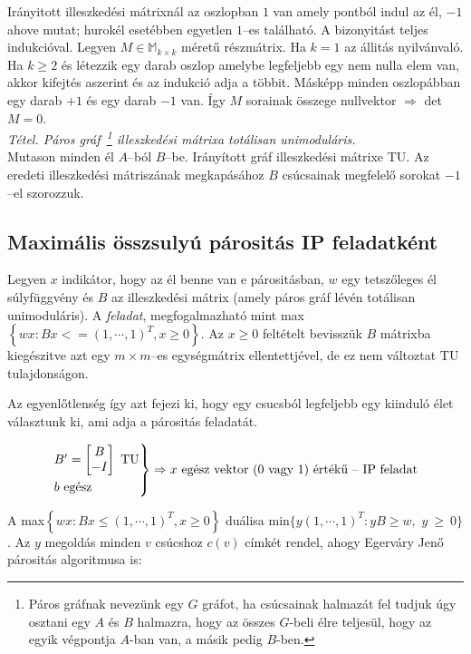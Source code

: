 Irányitott illeszkedési mátrixnál az oszlopban $1$ van amely pontból indul az
él, $-1$ ahove mutat; hurokél esetébben egyetlen $1$--es található. A
bizonyitást teljes indukcióval. Legyen $M \in \mathbb{M}_{k\times k}$ méretű
részmátrix. Ha $k=1$ az állitás nyilvánvaló. Ha $k \geq 2$ és létezzik egy darab
oszlop amelybe legfeljebb egy nem nulla elem van, akkor kifejtés aszerint és az
indukció adja a többit. Másképp minden oszlopábban egy darab $+1$ és egy darab
$-1$ van. Így $M$ sorainak összege nullvektor $\Rightarrow$ det$M=0$.\\

\emph{Tétel. Páros gráf~\footnote{Páros gráfnak nevezünk egy $G$ gráfot, ha
csúcsainak halmazát fel tudjuk úgy osztani egy $A$ és $B$ halmazra, hogy az
összes $G$-beli élre teljesül, hogy az egyik végpontja $A$-ban van, a másik
pedig $B$-ben.} illeszkedési mátrixa totálisan unimoduláris.}\\ 

Mutason minden él $A$--ból $B$--be. Irányított gráf illeszkedési mátrixe TU. Az
eredeti illeszkedési mátriszának megkapásához $B$ csúcsainak megfelelő sorokat
$-1$--el szorozzuk.

\subsection{Maximális összsulyú párositás IP feladatként}

Legyen $x$ indikátor, hogy az él benne van e párositásban, $w$ egy tetszőleges
él súlyfüggvény és $B$ az illeszkedési mátrix (amely páros gráf lévén totálisan
unimoduláris). A \emph{feladat}, megfogalmazható mint max$\left\{ wx:Bx <= (1,
\cdots, 1)^T, x \geq 0 \right\}$. Az $x \geq 0 $ feltételt bevisszük $B$
mátrixba kiegészitve azt egy $m \times m$--es egységmátrix ellentettjével, de ez
nem változtat TU tulajdonságon. 

Az egyenlőtlenség így azt fejezi ki, hogy egy csucsból legfeljebb egy kiinduló
élet választunk ki, ami adja a párositás feladatát. 

\[
\begin{rcases}
B'=\begin{bmatrix} B \\ -I \end{bmatrix} \text{ TU} \\
b \text{ egész}
\end{rcases} \Rightarrow x \text{ egész vektor ($0$ vagy $1$) értékű -- IP feladat}
\]

A max$\left\{ wx : Bx \leq (1,\cdots,1)^T, x \geq 0 \right\}$ duálisa
min$\{ y(1,\cdots,1)^T : yB \geq w,$ $y~\geq~0\}$. Az $y$ megoldás
minden $v$ csúcshoz $c(v)$ címkét rendel, ahogy Egerváry Jenő párositás
algoritmusa is:


